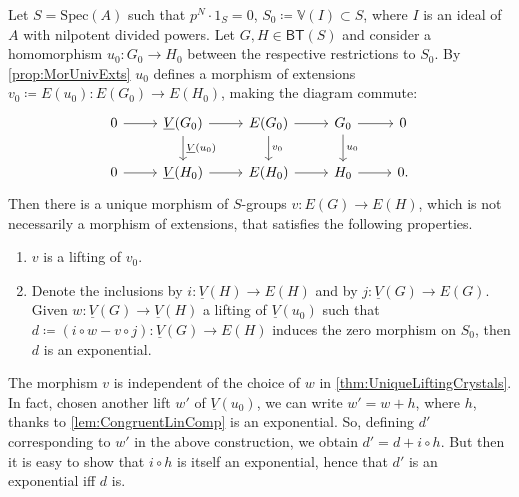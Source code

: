 \documentclass[../Main]{subfiles}
\begin{document}
\begin{thm}\label{thm:UniqueLiftingCrystals}
	Let $S = \mathrm{Spec}(A)$ such that $p^N \cdot 1_S = 0$,
	$S_0 \coloneqq \mathbb{V}(I) \subset S$, where $I$ is
	an ideal of $A$ with nilpotent divided powers.
	Let $G, H \in \mathsf{BT}(S)$ and consider a homomorphism
	$u_0\colon G_0 \to H_0$ between the respective restrictions to $S_0$.
	By \cref{prop:MorUnivExts} $u_0$ defines
	a morphism of extensions $v_0 \coloneqq E(u_0)\colon E(G_0) \to E(H_0)$,
	making the diagram commute:
	\begin{equation*}
	\begin{tikzcd}
		0 \arrow[r, "", rightarrow] &
		\underline{V}(G_0) \arrow[d, "\underline{V}(u_0)", rightarrow] 
		\arrow[r, "", rightarrow] &
		E(G_0) \arrow[d, "v_0", rightarrow]
		\arrow[r, "", rightarrow] &
		G_0 \arrow[d, "u_0", rightarrow]
		\arrow[r, "", rightarrow] &
		0 \\
		0 \arrow[r, "", rightarrow] &
		\underline{V}(H_0) \arrow[r, "", rightarrow] &
		E(H_0) \arrow[r, "", rightarrow] &
		H_0 \arrow[r, "", rightarrow] &
		0
	.\end{tikzcd}
	\end{equation*}
	Then there is a unique morphism of $S$-groups
	$v\colon E(G) \to E(H)$, which is not necessarily a morphism
	of extensions, that satisfies the following properties.
\begin{enumerate}
	\item $v$ is a lifting of $v_0$.

	\item Denote the inclusions by $i\colon \underline{V}(H) \to E(H)$ and by 
		$j\colon \underline{V}(G) \to E(G)$.
		Given $w\colon \underline{V}(G) \to \underline{V}(H)$ a lifting of $\underline{V}(u_0)$
		such that $d\coloneqq (i \circ w - v \circ j)\colon \underline{V}(G) \to E(H)$
		induces the zero morphism on $S_0$, then $d$ is an exponential.
\end{enumerate}
\end{thm}


\begin{rem}
	The morphism $v$ is independent of the choice of $w$
	in \cref{thm:UniqueLiftingCrystals}.
	In fact, chosen another lift $w'$ of $\underline{V}(u_0)$, we 
	can write $w' = w + h$, where $h$, thanks to \cref{lem:CongruentLinComp}
	is an exponential.
	So, defining $d'$ corresponding to $w'$ in the
	above construction, we obtain $d' = d + i \circ h$.
	But then it is easy to show that $i \circ h$ is
	itself an exponential, hence that $d'$ is an
	exponential iff $d$ is.
\end{rem}
\end{document}
